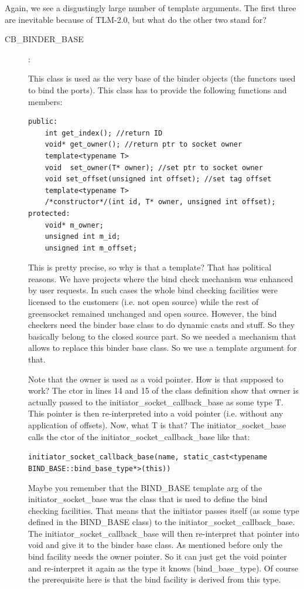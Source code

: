 \documentclass[a4paper,10pt]{article}          %
\newcommand{\code}[1]{{\ttfamily#1}}
\begin{document}
Again, we see a disgustingly large number of template arguments. The first three are inevitable because of TLM-2.0, but what do the other two stand for?

\begin{description}
\item[\code{CB\_BINDER\_BASE}]:

This class is used as the very base of the binder objects (the functors used to bind the ports). This class has to provide the following functions and members:
\begin{lstlisting}
public:
    int get_index(); //return ID
    void* get_owner(); //return ptr to socket owner
    template<typename T>
    void  set_owner(T* owner); //set ptr to socket owner
    void set_offset(unsigned int offset); //set tag offset
    template<typename T>
    /*constructor*/(int id, T* owner, unsigned int offset);
protected:
    void* m_owner;
    unsigned int m_id;
    unsigned int m_offset;  
\end{lstlisting}

This is pretty precise, so why is that a template? That has political reasons. We have projects where the bind check mechanism was enhanced by user requests. In such cases the whole bind checking facilities were licensed to the customers (i.e. not open source) while the rest of greensocket remained unchanged and open source. However, the bind checkers need the binder base class to do dynamic casts and stuff. So they basically belong to the closed source part. So we needed a mechanism that allows to replace this binder base class. So we use a template argument for that.

Note that the owner is used as a void pointer. How is that supposed to work? The ctor in lines 14 and 15 of the class definition show that owner is actually passed to the \code{initiator\_socket\_callback\_base} as some type \code{T}. This pointer is then re-interpreted into a void pointer (i.e. without any application of offsets). Now, what \code{T} is that? The \code{initiator\_socket\_base} calls the ctor of the \code{initiator\_socket\_callback\_base} like that:

\lstinline{initiator_socket_callback_base(name, static_cast<typename BIND_BASE::bind_base_type*>(this))}

Maybe you remember that the \code{BIND\_BASE} template arg of the \code{initiator\_socket\_base} was the class that is used to define the bind checking facilities. That means that the initiator passes itself (as some type defined in the \code{BIND\_BASE} class) to the \code{initiator\_socket\_callback\_base}. The \code{initiator\_socket\_callback\_base} will then re-interpret that pointer into void and give it to the binder base class. As mentioned before only the bind facility needs the owner pointer. So it can just get the void pointer and re-interpret it again as the type it knows (\code{bind\_base\_type}). Of course the prerequisite here is that the bind facility is derived from this type.  


\end{description}
\end{document}
